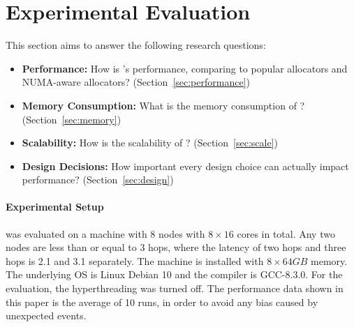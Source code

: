 \section{Experimental Evaluation}
\label{sec:evaluation}

This section aims to answer the following research questions: 

\begin{itemize}
\item \textbf{Performance:} How is \NM{}'s performance, comparing to popular allocators and NUMA-aware allocators? (Section~\ref{sec:performance}) 
\item \textbf{Memory Consumption:} What is the memory consumption of \NM{}? (Section~\ref{sec:memory})
\item \textbf{Scalability:} How is the scalability of \NM{}? (Section~\ref{sec:scale})
\item \textbf{Design Decisions:} How important every design choice can actually impact performance? (Section~\ref{sec:design})	
\end{itemize}

\paragraph{Experimental Setup}
 \NM{} was evaluated on a machine with 8 nodes with $8\times16$ cores in total. Any two nodes are less than or equal to 3 hops, where the latency of two hops and three hops is 2.1 and 3.1 separately. The machine is installed with $8\times64GB$ memory. The underlying OS is Linux Debian 10 and the compiler is GCC-8.3.0. For the evaluation, the hyperthreading was turned off. The performance data shown in this paper is the average of 10 runs, in order to avoid any bias caused by unexpected events.  

